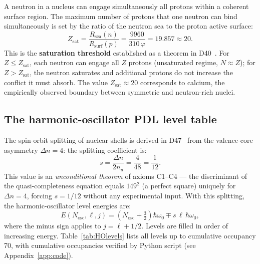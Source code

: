 \documentclass[11pt,a4paper]{article}
\theoremstyle{definition}
\theoremstyle{remark}
\newcommand{\Rsurf}{R_{\mathrm{surf}}}
\newcommand{\Rsea}{R_{\mathrm{sea}}}
\newcommand{\Zsat}{Z_{\mathrm{sat}}}
\newcommand{\Dn}{\Delta n}
\newcommand{\nuu}{n_u}
\newcommand{\vp}{\varphi}
\begin{document}
A neutron in a nucleus can engage simultaneously all protons within a coherent surface region. The maximum number of protons that one neutron can bind simultaneously is set by the ratio of the neutron sea to the proton active surface:
\begin{equation}
  \Zsat = \frac{\Rsea(n)}{\Rsurf(p)} = \frac{9960}{310\,\vp} = 19.857 \approx 20.
  \label{eq:Zsat}
\end{equation}
This is the \textbf{saturation threshold} established as a theorem in D40~\cite{PDL_D40}. For $Z \leq \Zsat$, each neutron can engage all $Z$ protons (unsaturated regime, $N \approx Z$); for $Z > \Zsat$, the neutron saturates and additional protons do not increase the conflict it must absorb. The value $\Zsat \approx 20$ corresponds to calcium, the empirically observed boundary between symmetric and neutron-rich nuclei.

\subsection{The harmonic-oscillator PDL level table}
\label{subsec:HOlevels}

The spin-orbit splitting of nuclear shells is derived in D47~\cite{PDL_D47} from the valence-core asymmetry $\Dn = 4$: the splitting coefficient is:
\begin{equation}
  s = \frac{\Dn}{2\nuu} = \frac{4}{48} = \frac{1}{12}.
  \label{eq:splitting}
\end{equation}
This value is an \emph{unconditional theorem} of axioms C1--C4 --- the discriminant of the quasi-completeness equation equals $149^2$ (a perfect square) uniquely for $\Dn = 4$, forcing $s = 1/12$ without any experimental input. With this splitting, the harmonic-oscillator level energies are:
\begin{equation}
  E(N_{\mathrm{osc}}, \ell, j) = \left(N_{\mathrm{osc}} + \tfrac{3}{2}\right)\hbar\omega_0 \mp s\,\ell\,\hbar\omega_0,
  \label{eq:HOenergy}
\end{equation}
where the minus sign applies to $j = \ell + 1/2$. Levels are filled in order of increasing energy. Table~\ref{tab:HOlevels} lists all levels up to cumulative occupancy 70, with cumulative occupancies verified by Python script (see Appendix~\ref{app:code}).
\end{document}
